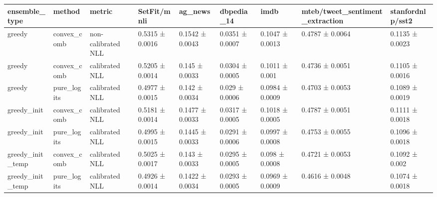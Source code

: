 \begin{tabular}{lllllllll}
\toprule
ensemble_type & method & metric & SetFit/mnli & ag_news & dbpedia_14 & imdb & mteb/tweet_sentiment_extraction & stanfordnlp/sst2 \\
\midrule
greedy & convex_comb & non-calibrated NLL & 0.5315 ± 0.0016 & 0.1542 ± 0.0043 & 0.0351 ± 0.0007 & 0.1047 ± 0.0013 & 0.4787 ± 0.0064 & 0.1135 ± 0.0023 \\
greedy & convex_comb & calibrated NLL & 0.5205 ± 0.0014 & 0.145 ± 0.0033 & 0.0304 ± 0.0005 & 0.1011 ± 0.001 & 0.4736 ± 0.0051 & 0.1105 ± 0.0016 \\
greedy & pure_logits & calibrated NLL & 0.4977 ± 0.0015 & 0.142 ± 0.0034 & 0.029 ± 0.0006 & 0.0984 ± 0.0009 & 0.4703 ± 0.0053 & 0.1089 ± 0.0019 \\
greedy_init & convex_comb & calibrated NLL & 0.5181 ± 0.0014 & 0.1477 ± 0.0033 & 0.0317 ± 0.0005 & 0.1018 ± 0.0005 & 0.4787 ± 0.0051 & 0.1111 ± 0.0018 \\
greedy_init & pure_logits & calibrated NLL & 0.4995 ± 0.0015 & 0.1445 ± 0.0033 & 0.0291 ± 0.0006 & 0.0997 ± 0.0008 & 0.4753 ± 0.0055 & 0.1096 ± 0.0018 \\
greedy_init_temp & convex_comb & calibrated NLL & 0.5025 ± 0.0017 & 0.143 ± 0.0033 & 0.0295 ± 0.0005 & 0.098 ± 0.0008 & 0.4721 ± 0.0053 & 0.1092 ± 0.002 \\
greedy_init_temp & pure_logits & calibrated NLL & 0.4926 ± 0.0014 & 0.1422 ± 0.0034 & 0.0293 ± 0.0005 & 0.0969 ± 0.0009 & 0.4616 ± 0.0048 & 0.1074 ± 0.0018 \\
\bottomrule
\end{tabular}
